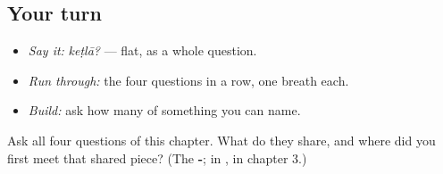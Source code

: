 \subsection*{Your turn}
\begin{itemize}
\raggedright
  \item \emph{Say it:} \emph{keṭlā?} — flat, as a whole question.
  \item \emph{Run through:} the four questions in a row, one breath each.
  \item \emph{Build:} ask how many of something you can name.
\end{itemize}

\begin{tcolorbox}[breakable,colback=teal!4,colframe=teal!35!black,title={Before you move on}]
Ask all four questions of this chapter. What do they share, and where did you first meet that shared piece? (The \textbf{-}; in \textbf{}, in chapter 3.)
\end{tcolorbox}
